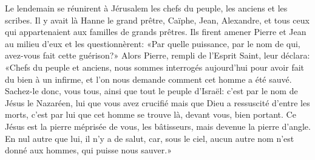 Le lendemain se réunirent à Jérusalem les chefs du peuple, les anciens et les scribes.
Il y avait là Hanne le grand prêtre, Caïphe, Jean, Alexandre,
	et tous ceux qui appartenaient aux familles de grands prêtres.
Ils firent amener Pierre et Jean au milieu d’eux et les questionnèrent:
	«Par quelle puissance, par le nom de qui, avez-vous fait cette guérison?»
Alors Pierre, rempli de l’Esprit Saint, leur déclara:
	«Chefs du peuple et anciens,
	nous sommes interrogés aujourd’hui pour avoir fait du bien à un infirme,
	et l’on nous demande comment cet homme a été sauvé.
Sachez-le donc, vous tous, ainsi que tout le peuple d’Israël:
	c’est par le nom de Jésus le Nazaréen,
	lui que vous avez crucifié mais que Dieu a ressuscité d’entre les morts,
	c’est par lui que cet homme se trouve là, devant vous, bien portant.
Ce Jésus est la pierre méprisée de vous, les bâtisseurs, mais devenue la pierre d’angle.
En nul autre que lui, il n’y a de salut,
	car, sous le ciel, aucun autre nom n’est donné aux hommes, qui puisse nous sauver.»
